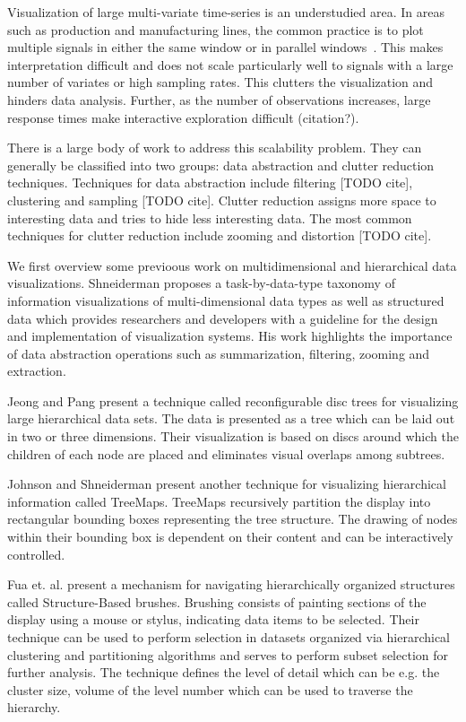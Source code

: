 
Visualization of large multi-variate time-series is an understudied area. In areas such as production and manufacturing lines, the common practice is to plot multiple signals in either the same window or in parallel windows~\cite{}. This makes interpretation difficult and does not scale particularly well to signals with a large number of variates or high sampling rates. %
This clutters the visualization and hinders data analysis. Further, as the number of observations increases,
 large response times make interactive exploration difficult (citation?).

There is a large body of work to address this scalability problem.
They can generally be classified into two groups: data abstraction and clutter reduction 
techniques. Techniques for data abstraction include filtering [TODO cite], clustering
and sampling [TODO cite]. Clutter reduction assigns more space to interesting data and tries to hide less interesting data.
The most common techniques for clutter reduction include zooming and distortion [TODO cite].


We first overview some previoous work on multidimensional and hierarchical data visualizations. 
Shneiderman \cite{545307} proposes a task-by-data-type taxonomy of information visualizations of multi-dimensional
data types as well as structured data which provides researchers and developers with a guideline for
the design and implementation of visualization systems. His work highlights the importance of data
abstraction operations such as summarization, filtering, zooming and extraction.

Jeong and Pang \cite{729555} present a technique called reconfigurable disc trees for visualizing large 
hierarchical data sets. The data is presented as a tree which can be laid out in two or three dimensions.
Their visualization is based on discs around which the children of each node are placed and eliminates
visual overlaps among subtrees.

Johnson and Shneiderman \cite{Johnson:1991:TSA:949607.949654} present another technique for visualizing hierarchical
information called TreeMaps. TreeMaps recursively partition the display into rectangular bounding boxes representing the 
tree structure. The drawing of nodes within their bounding box is dependent on their content and can be interactively
controlled.

Fua et. al. \cite{Fua:2000:SBM:614278.614457} present a mechanism for navigating hierarchically organized structures
called Structure-Based brushes. Brushing consists of painting sections of the display using a mouse or stylus, indicating
data items to be selected. Their technique can be used to perform selection in datasets organized via hierarchical
clustering and partitioning algorithms and serves to perform subset selection for further analysis. The technique defines
the level of detail which can be e.g. the cluster size, volume of the level number which can be used to traverse the
hierarchy.

